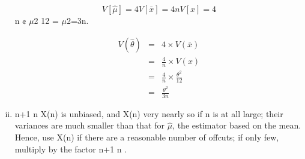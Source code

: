 \documentclass[a4paper,12pt]{article}
\begin{document}
\begin{enumerate}[(i)]
\[V [\hat{\mu}] = 4V [\bar{x}] = 4
nV [x] = 4\]
n ¢ $\mu$2
12 = $\mu$2=3n.

\begin{eqnarray*}
V(\hat{\theta}) &=& 4 \times V(\bar{x})\\
 &=& \frac{4}{n} \times V(x) \\
 &=& \frac{4}{n} \times \frac{\theta^2}{12} \\
 &=& \frac{\theta^2}{3n}
\end{eqnarray*}

\item n+1
n X(n) is unbiased, and X(n) very nearly so if n is at all large; their
variances are much smaller than that for $\hat{\mu}$, the estimator based on the mean.
Hence, use X(n) if there are a reasonable number of offcuts; if only few,
multiply by the factor n+1
n .
\end{enumerate}
\end{document}
